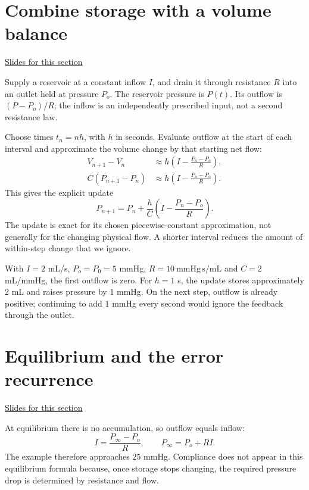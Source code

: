 \documentclass[11pt,letterpaper]{article}
\theoremstyle{definition}\newtheorem{definition}{Definition}\newtheorem{example}{Example}
\numberwithin{equation}{section}
\begin{document}
\section{Combine storage with a volume balance}
\hypertarget{note-combine-storage-with-a-volume-balance}{}\label{note:combine-storage-with-a-volume-balance}
{\small \href{slides.html\#frame=a-reservoir-with-a-prescribed-supply\&step=1}{Slides for this section}}\par
Supply a reservoir at a constant inflow $I$, and drain it through resistance $R$ into an outlet held at pressure $P_o$. The reservoir pressure is $P(t)$. Its outflow is $(P-P_o)/R$; the inflow is an independently prescribed input, not a second resistance law.

Choose times $t_n=n h$, with $h$ in seconds. Evaluate outflow at the start of each interval and approximate the volume change by that starting net flow:
\begin{align}
V_{n+1}-V_n&\approx h\left(I-\frac{P_n-P_o}{R}\right),\\
C(P_{n+1}-P_n)&\approx h\left(I-\frac{P_n-P_o}{R}\right).
\end{align}
This gives the explicit update
\begin{equation}
P_{n+1}=P_n+\frac hC\left(I-\frac{P_n-P_o}{R}\right).
\end{equation}
The update is exact for its chosen piecewise-constant approximation, not generally for the changing physical flow. A shorter interval reduces the amount of within-step change that we ignore.

With $I=2$ mL/s, $P_o=P_0=5$ mmHg, $R=10\ \mathrm{mmHg\,s/mL}$ and $C=2$ mL/mmHg, the first outflow is zero. For $h=1$ s, the update stores approximately $2$ mL and raises pressure by $1$ mmHg. On the next step, outflow is already positive; continuing to add $1$ mmHg every second would ignore the feedback through the outlet.
\section{Equilibrium and the error recurrence}
\hypertarget{note-equilibrium-and-the-error-recurrence}{}\label{note:equilibrium-and-the-error-recurrence}
{\small \href{slides.html\#frame=equilibrium-is-a-flow-balance\&step=1}{Slides for this section}}\par
At equilibrium there is no accumulation, so outflow equals inflow:
\[
I=\frac{P_\infty-P_o}{R},\qquad P_\infty=P_o+RI.
\]
The example therefore approaches $25$ mmHg. Compliance does not appear in this equilibrium formula because, once storage stops changing, the required pressure drop is determined by resistance and flow.
\end{document}
